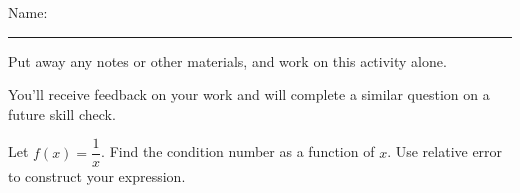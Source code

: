 \documentclass[12pt,letterpaper,noanswers]{exam}
\begin{document}
 \pdfpageheight 11in 
  \pdfpagewidth 8.5in

\noindent Name: \rule{2.5in}{0.5pt}

\noindent Put away any notes or other materials, and work on this activity alone.

\noindent You'll receive feedback on your work and will complete a similar question on a future skill check.


\begin{questions}
\item 
Let $f(x) = \dfrac{1}{x}$.  Find the condition number as a function of $x$.  Use relative error to construct your expression.


\end{questions}
\end{document}
